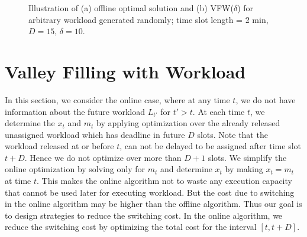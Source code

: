 \documentclass[10pt,conference,compsocconf,letterpaper]{IEEEtran}
\begin{document}
\begin{figure}[!t]
\centerline{
\hfil
{}}
\caption{Illustration of (a) offline optimal solution and (b) VFW($\delta$) for arbitrary workload generated randomly; time slot length = 2 min, $D=15$, $\delta=10$.}
\label{fig:solutionrandom}
\end{figure}



\section{Valley Filling with Workload}
In this section, we consider the online case, where at any time $t$, we do not have information about the future workload $L_{t'}$ for $t'>t$. At each time $t$, we determine the $x_t$ and $m_t$  by applying optimization over the already released unassigned workload which has deadline in future $D$ slots. Note that the workload released at or before $t$, can not be delayed to be assigned after time slot $t+D$. Hence we do not optimize over more than $D+1$ slots.  We simplify the online optimization by solving only for $m_t$ and determine $x_t$ by making $x_t = m_t$ at time $t$. This makes the online algorithm not to waste any execution capacity that cannot be used later for executing workload. But the cost due to switching in the online algorithm may be higher than the offline algorithm. Thus our goal is to design strategies to reduce the switching cost. In the online algorithm, we reduce the switching cost by optimizing the total cost for the interval $[t,t+D]$.
\end{document}
